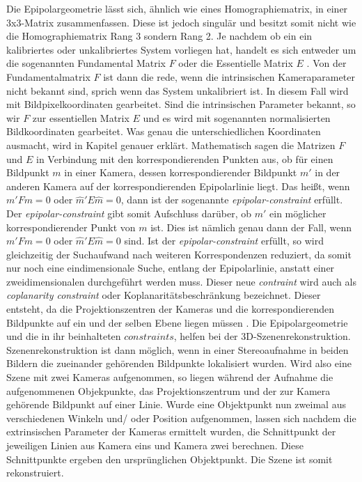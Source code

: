 Die Epipolargeometrie lässt sich, ähnlich wie eines Homographiematrix, in einer 3x3-Matrix zusammenfassen. Diese ist jedoch singulär und besitzt somit nicht wie die Homographiematrix Rang 3 sondern Rang 2. Je nachdem ob ein ein kalibriertes oder unkalibriertes System vorliegen hat, handelt es sich entweder um die sogenannten Fundamental Matrix $F$ oder die Essentielle Matrix $E$ \cite{Elements,HZ,ZZPaper,Zhang2014,ZZGXr}. Von der Fundamentalmatrix $F$ ist dann die rede, wenn die intrinsischen Kameraparameter nicht bekannt sind, sprich wenn das System unkalibriert ist. In diesem Fall wird mit Bildpixelkoordinaten gearbeitet. Sind die intrinsischen Parameter bekannt, so wir $F$ zur essentiellen Matrix $E$ und es wird mit sogenannten normalisierten Bildkoordinaten gearbeitet\cite{ZZPaper}. Was genau die unterschiedlichen Koordinaten ausmacht, wird in Kapitel  genauer erklärt. Mathematisch sagen die Matrizen $F$ und $E$ in Verbindung mit den korrespondierenden Punkten aus, ob für einen Bildpunkt $m$ in einer Kamera, dessen korrespondierender Bildpunkt $m'$ in der anderen Kamera auf der korrespondierenden Epipolarlinie liegt.  Das heißt, wenn $m'Fm = 0$ oder $\hat{m}'E\hat{m}= 0$, dann ist der sogenannte \textit{epipolar-constraint} erfüllt. Der \textit{epipolar-constraint} gibt somit Aufschluss darüber, ob $m'$ ein möglicher korrespondierender Punkt von $m$ ist. Dies ist nämlich genau dann der Fall, wenn $m'Fm = 0$ oder $\hat{m}'E\hat{m}= 0$ sind\cite{HZ,Zhang2014}. Ist der \textit{epipolar-constraint} erfüllt, so wird gleichzeitig der Suchaufwand nach weiteren Korrespondenzen reduziert, da somit nur noch eine eindimensionale Suche, entlang der Epipolarlinie, anstatt einer zweidimensionalen durchgeführt werden muss. Dieser neue \textit{contraint} wird auch als \textit{coplanarity constraint} oder Koplanaritätsbeschränkung bezeichnet. Dieser entsteht, da die Projektionszentren der Kameras und die korrespondierenden Bildpunkte auf ein und der selben Ebene liegen müssen \cite{Zhang2014}. Die Epipolargeometrie und die in ihr beinhalteten $constraints$, helfen bei der 3D-Szenenrekonstruktion. Szenenrekonstruktion ist dann möglich, wenn in einer Stereoaufnahme in beiden Bildern die zueinander gehörenden Bildpunkte lokalisiert wurden. Wird also eine Szene mit zwei Kameras aufgenommen, so liegen während der Aufnahme die aufgenommenen Objekpunkte, das Projektionszentrum und der zur Kamera gehörende Bildpunkt auf einer Linie. Wurde eine Objektpunkt nun zweimal aus verschiedenen Winkeln und/ oder Position aufgenommen, lassen sich nachdem die extrinsischen Parameter der Kameras ermittelt wurden, die Schnittpunkt der jeweiligen Linien aus Kamera eins und Kamera zwei berechnen. Diese Schnittpunkte ergeben den ursprünglichen Objektpunkt. Die Szene ist somit rekonstruiert\cite{Elements,ZZGXr,HZ}. 


